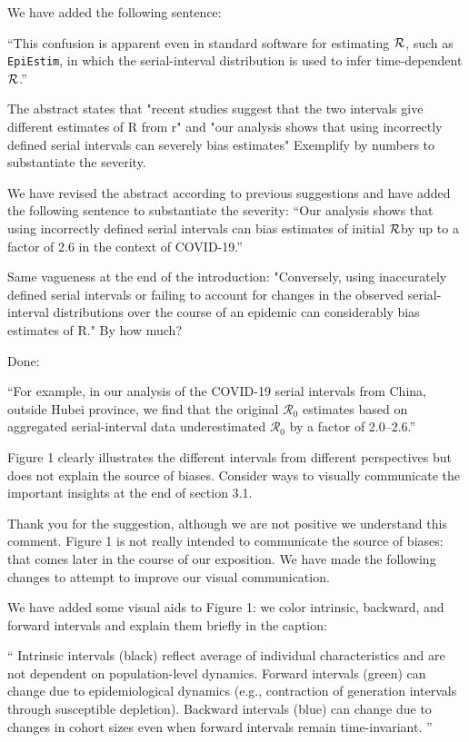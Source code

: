 \documentclass[12pt]{article}
\newcommand{\RR}{\ensuremath{{\cal R}}}
\newcommand{\Ro}{\ensuremath{{\mathcal R}_{0}}\xspace}
\newcommand{\revtext}{\textsf}
\begin{document}
We have added the following sentence:

``This confusion is apparent even in standard software for estimating \RR, such as \texttt{EpiEstim}, in which the serial-interval distribution is used to infer time-dependent \RR \citep{thompson2019improved}.''

\revtext{The abstract states that "recent studies suggest that the two intervals give different estimates of R from r" and "our analysis shows that using incorrectly defined serial intervals can severely bias estimates" Exemplify by numbers to substantiate the severity.}

We have revised the abstract according to previous suggestions and have added the following sentence to substantiate the severity: ``Our analysis shows that using incorrectly defined serial intervals can bias estimates of initial \RR by up to a factor of 2.6 in the context of COVID-19.''

\revtext{Same vagueness at the end of the introduction: "Conversely, using inaccurately defined serial intervals or failing to account for changes in the observed serial-interval distributions over the course of an epidemic can considerably bias estimates of R." By how much?}

Done:

``For example, in our analysis of the COVID-19 serial intervals from China, outside Hubei province, we find that the original \Ro estimates based on aggregated serial-interval data underestimated \Ro by a factor of 2.0--2.6.''

\revtext{Figure 1 clearly illustrates the different intervals from different perspectives but does not explain the source of biases. Consider ways to visually communicate the important insights at the end of section 3.1.}

Thank you for the suggestion, although we are not positive we understand this comment. Figure 1 is not really intended to communicate the source of biases: that comes later in the course of our exposition. We have made the following changes to attempt to improve our visual communication.

We have added some visual aids to Figure 1: we color intrinsic, backward, and forward intervals and explain them briefly in the caption:

``
Intrinsic intervals (black) reflect average of individual characteristics and are not dependent on population-level dynamics.
  Forward intervals (green) can change due to epidemiological dynamics (e.g., contraction of generation intervals through susceptible depletion).
  Backward intervals (blue) can change due to changes in cohort sizes even when forward intervals remain time-invariant.
''
\end{document}
